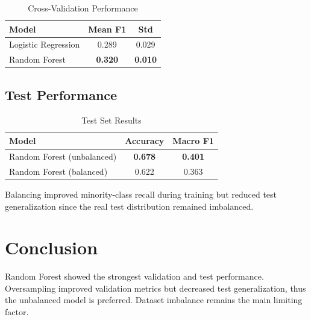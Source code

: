 \documentclass[conference]{IEEEtran}
\begin{document}
\begin{table}[htbp]
\centering
\caption{Cross-Validation Performance}
\begin{tabular}{lcc}
\toprule
\textbf{Model} & \textbf{Mean F1} & \textbf{Std} \\
\midrule
Logistic Regression & 0.289 & 0.029 \\
Random Forest & \textbf{0.320} & \textbf{0.010} \\
\bottomrule
\end{tabular}
\end{table}

\subsection{Test Performance}
\begin{table}[htbp]
\centering
\caption{Test Set Results}
\begin{tabular}{lcc}
\toprule
\textbf{Model} & \textbf{Accuracy} & \textbf{Macro F1} \\
\midrule
Random Forest (unbalanced) & \textbf{0.678} & \textbf{0.401} \\
Random Forest (balanced) & 0.622 & 0.363 \\
\bottomrule
\end{tabular}
\end{table}

Balancing improved minority-class recall during training but reduced test
generalization since the real test distribution remained imbalanced.

\section{Conclusion}
Random Forest showed the strongest validation and test performance.
Oversampling improved validation metrics but decreased test generalization,
thus the unbalanced model is preferred. Dataset imbalance remains the main
limiting factor.
\end{document}
